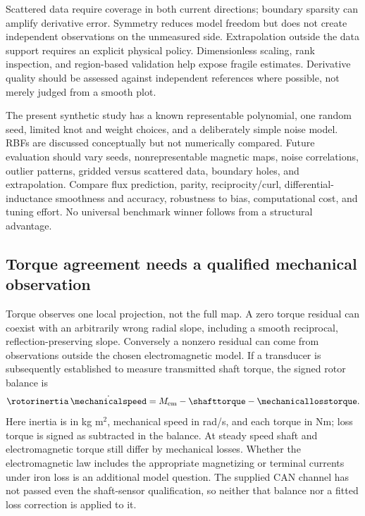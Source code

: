 Scattered data require coverage in both current directions; boundary sparsity
can amplify derivative error. Symmetry reduces model freedom but does not
create independent observations on the unmeasured side. Extrapolation outside
the data support requires an explicit physical policy. Dimensionless scaling,
rank inspection, and region-based validation help expose fragile estimates.
Derivative quality should be assessed against independent references where
possible, not merely judged from a smooth plot.

The present synthetic study has a known representable polynomial, one random
seed, limited knot and weight choices, and a deliberately simple noise model.
RBFs are discussed conceptually but not numerically compared. Future evaluation
should vary seeds, nonrepresentable magnetic maps, noise correlations, outlier
patterns, gridded versus scattered data, boundary holes, and extrapolation.
Compare flux prediction, parity, reciprocity/curl, differential-inductance
smoothness and accuracy, robustness to bias, computational cost, and tuning
effort. No universal benchmark winner follows from a structural advantage.

\subsection{Torque agreement needs a qualified mechanical observation}
\label{sec:torque-ambiguity-discussion}
Torque observes one local projection, not the full map. A zero torque residual
can coexist with an arbitrarily wrong radial slope, including a smooth
reciprocal, reflection-preserving slope. Conversely a nonzero residual can
come from observations outside the chosen electromagnetic model.
If a transducer is subsequently established to measure transmitted shaft
torque, the signed rotor balance is
\begin{equation}
 \rotorinertia\,\dot{\mechanicalspeed}
   =M_{\rm em}-\shafttorque-\mechanicallosstorque .
 \label{eq:shaft-torque-balance}
\end{equation}
Here inertia is in kg m$^2$, mechanical speed in rad/s, and each torque
in Nm; loss torque is signed as subtracted in the balance. At steady
speed shaft and electromagnetic torque still differ by mechanical losses.
Whether the electromagnetic law includes the appropriate magnetizing or
terminal currents under iron loss is an additional model question.
The supplied CAN channel has not passed even the shaft-sensor qualification,
so neither that balance nor a fitted loss correction is applied to it.

